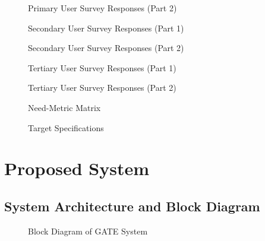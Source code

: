 \documentclass[12pt,a4paper]{report}
\begin{document}
\begin{figure}[ht]
\centering
\vspace{6cm}
\caption{Primary User Survey Responses (Part 2)}
\end{figure}

\begin{figure}[ht]
\centering
\vspace{6cm}
\caption{Secondary User Survey Responses (Part 1)}
\end{figure}

\begin{figure}[ht]
\centering
\vspace{6cm}
\caption{Secondary User Survey Responses (Part 2)}
\end{figure}

\begin{figure}[ht]
\centering
\vspace{6cm}
\caption{Tertiary User Survey Responses (Part 1)}
\end{figure}

\begin{figure}[ht]
\centering
\vspace{6cm}
\caption{Tertiary User Survey Responses (Part 2)}
\end{figure}

\begin{figure}[ht]
\centering
\vspace{6cm}
\caption{Need-Metric Matrix}
\end{figure}

\begin{figure}[ht]
\centering
\vspace{6cm}
\caption{Target Specifications}
\end{figure}

\chapter{Proposed System}

\section{System Architecture and Block Diagram}

\begin{figure}[ht]
\centering
\vspace{6cm}
\caption{Block Diagram of GATE System}
\end{figure}
\end{document}
